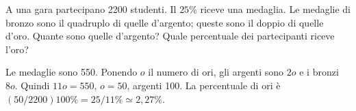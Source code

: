 
\begin{esercizio}
A una gara partecipano 2200 studenti. Il $25\%$ riceve una medaglia. Le medaglie di bronzo sono il quadruplo di quelle d'argento; queste sono il doppio di quelle d'oro. Quante sono quelle d'argento? Quale percentuale dei partecipanti riceve l'oro?
\end{esercizio}

\begin{soluzione}
Le medaglie sono 550. Ponendo $o$ il numero di ori, gli argenti sono $2o$ e i bronzi $8o$. Quindi $11o=550$, $o=50$, argenti 100. La percentuale di ori è $(50/2200)100\%=25/11\%\simeq2{,}27\%$.
\end{soluzione}
